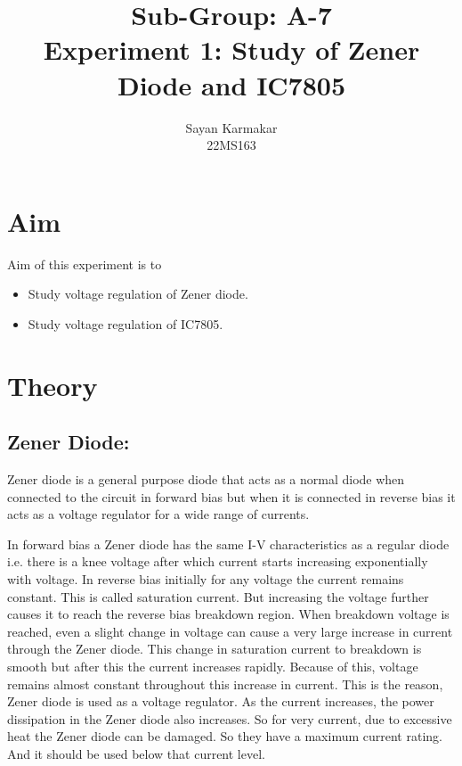 \documentclass[12pt]{article}
\begin{document}
\title{Sub-Group: A-7 \\ Experiment 1: Study of Zener Diode and IC7805}


\author{Sayan Karmakar \\22MS163 }
\date{}
\maketitle

\section{Aim}
Aim of this experiment is to
\begin{itemize}
    \item Study voltage regulation of Zener diode.
    \item Study voltage regulation of IC7805.
\end{itemize}

\section{Theory}
\subsection{Zener Diode:}
Zener diode is a general purpose diode that acts as a normal diode when connected to the circuit in forward bias but when it is connected in reverse bias it acts as a voltage regulator for a wide range of currents.

In forward bias a Zener diode has the same I-V characteristics as a  regular diode i.e. there is a knee voltage after which current starts increasing exponentially with voltage. In reverse bias initially for any voltage the current remains constant. This is called saturation current. But increasing the voltage further causes it to reach the reverse bias breakdown region. When breakdown voltage is reached, even a slight change in voltage can cause a very large increase in current through the Zener diode. This change in saturation current to breakdown is smooth but after this the current increases rapidly. Because of this, voltage remains almost constant throughout this increase in current. This is the reason, Zener diode is used as a voltage regulator.
As the current increases, the power dissipation in the Zener diode also increases. So for very current, due to excessive heat the Zener diode can be damaged. So they have a maximum current rating. And it should be used below that current level.
\end{document}
